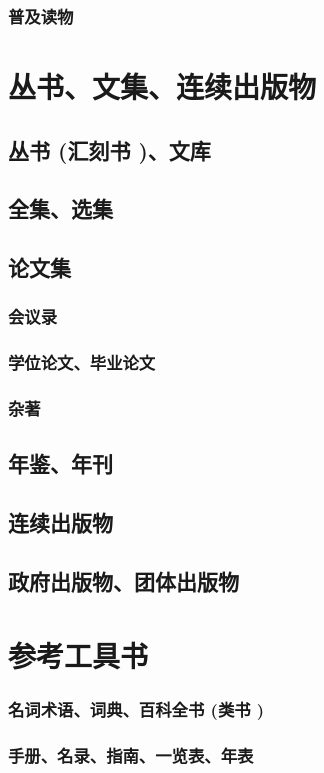 \documentclass[UTF8]{../ApplicationUniverse}
\begin{document}
    \subsubsection{普及读物}
\section{丛书、文集、连续出版物}
    \subsection{丛书 (汇刻书 )、文库}
    \subsection{全集、选集}
    \subsection{论文集}
        \subsubsection{会议录}
        \subsubsection{学位论文、毕业论文}
        \subsubsection{杂著}
    \subsection{年鉴、年刊}
    \subsection{连续出版物}
    \subsection{政府出版物、团体出版物}
\section{参考工具书}
    \subsubsection{名词术语、词典、百科全书 (类书 )}
    \subsubsection{手册、名录、指南、一览表、年表}
\end{document}
